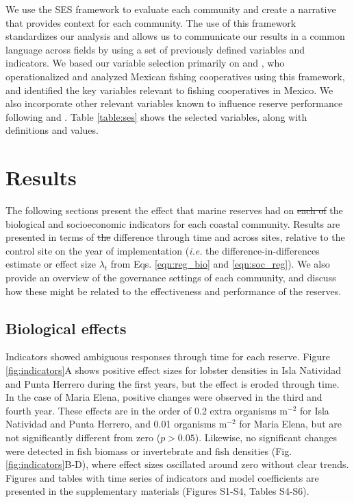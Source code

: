 \documentclass{frontiersSCNS}
\providecommand{\DIFdeltex}[1]{{\protect\color{red}\sout{#1}}}                      %
\providecommand{\DIFdelbegin}{} %
\providecommand{\DIFdelend}{} %
\providecommand{\DIFdel}[1]{\texorpdfstring{\DIFdeltex{#1}}{}} %
\begin{document}
We use the SES framework to evaluate each community and create a
narrative that provides context for each community. The use of this
framework standardizes our analysis and allows us to communicate our
results in a common language across fields by using a set of previously
defined variables and indicators. We based our variable selection
primarily on \citet{leslie_2015-na} and \citet{basurto_2013-oq}, who
operationalized and analyzed Mexican fishing cooperatives using this
framework, and identified the key variables relevant to fishing
cooperatives in Mexico. We also incorporate other relevant variables
known to influence reserve performance following
\citet{difranco_2016-Xw} and \citet{edgar_2014-UO}. Table
\ref{table:ses} shows the selected variables, along with definitions and
values.

\hypertarget{results}{%
\section{Results}\label{results}}

The following sections present the effect that marine reserves had on
\DIFdelbegin \DIFdel{each of }\DIFdelend the biological and socioeconomic indicators for each coastal community.
Results are presented in terms of \DIFdelbegin \DIFdel{the }\DIFdelend difference through time and across
sites, relative to the control site on the year of implementation
(\emph{i.e.} the difference-in-differences estimate or effect size
\(\lambda_t\) from Eqs. \ref{eqn:reg_bio} and \ref{eqn:soc_reg}). We
also provide an overview of the governance settings of each community,
and discuss how these might be related to the effectiveness and
performance of the reserves.

\hypertarget{biological-effects}{%
\subsection{Biological effects}\label{biological-effects}}

Indicators showed ambiguous responses through time for each reserve.
Figure \ref{fig:indicators}A shows positive effect sizes for lobster
densities in Isla Natividad and Punta Herrero during the first years,
but the effect is eroded through time. In the case of Maria Elena,
positive changes were observed in the third and fourth year. These
effects are in the order of 0.2 extra organisms \(\mathrm{m}^{-2}\) for
Isla Natividad and Punta Herrero, and 0.01 organisms \(\mathrm{m}^{-2}\)
for Maria Elena, but are not significantly different from zero
(\(p > 0.05\)). Likewise, no significant changes were detected in fish
biomass or invertebrate and fish densities (Fig.
\ref{fig:indicators}B-D), where effect sizes oscillated around zero
without clear trends. Figures and tables with time series of indicators
and model coefficients are presented in the supplementary materials
(Figures S1-S4, Tables S4-S6).
\end{document}
